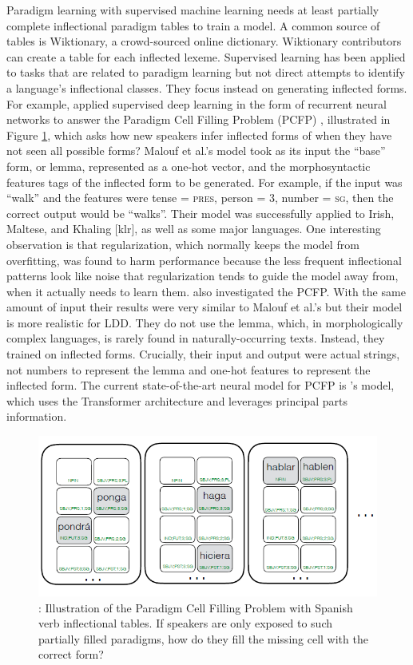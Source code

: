 \documentclass[12pt]{article}
\begin{document}
Paradigm learning with supervised machine learning needs at least partially complete inflectional paradigm tables to train a model. A common source of tables is Wiktionary, a crowd-sourced online dictionary. Wiktionary contributors can create a table for each inflected lexeme. Supervised learning has been applied to tasks that are related to paradigm learning but not direct attempts to identify a language's inflectional classes. They focus instead on generating inflected forms. For example,  applied supervised deep learning in the form of recurrent neural networks to answer the Paradigm Cell Filling Problem (PCFP) \cite{Ackerman_partsand}, illustrated in Figure \ref{fig:PCFP}, which asks how new speakers infer inflected forms of when they have not seen all possible forms? Malouf et al.'s model took as its input the ``base'' form, or lemma, represented as a one-hot vector, and the morphosyntactic features tags of the inflected form to be generated. For example, if the input was ``walk'' and the features were tense = \textsc{pres}, person = \textsc{3}, number = \textsc{sg}, then the correct output would be ``walks''. Their model was successfully applied to Irish, Maltese, and Khaling [klr], as well as some major languages. One interesting observation is that regularization, which normally keeps the model from overfitting, was found to harm performance because the less frequent inflectional patterns look like noise that regularization tends to guide the model away from, when it actually needs to learn them.  also investigated the PCFP. With the same amount of input their results were very similar to Malouf et al.'s but their model is more realistic for LDD. They do not use the lemma, which, in morphologically complex languages, is rarely found in naturally-occurring texts. Instead, they trained on inflected forms. Crucially, their input and output were actual strings, not numbers to represent the lemma and one-hot features to represent the inflected form. 
The current state-of-the-art neural model for PCFP is 's model, which uses the Transformer architecture and leverages principal parts information.

\begin{figure}[ht]
\begin{center}
\includegraphics[width=0.7\columnwidth]{PCFP.PNG}
\caption{: Illustration of the Paradigm Cell Filling Problem with Spanish verb inflectional tables. If speakers are only exposed to such partially filled paradigms, how do they fill the missing cell with the correct form?}
\label{fig:PCFP}
\end{center}
\end{figure}
\end{document}
